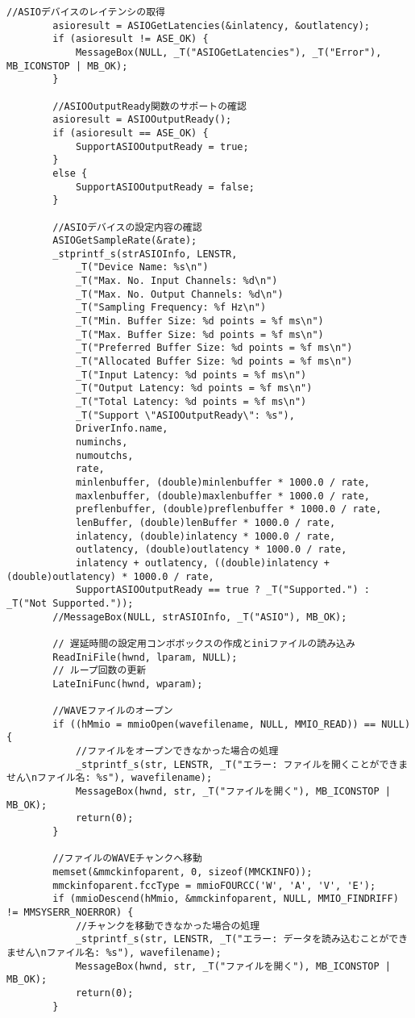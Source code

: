 \begin{lstlisting}[caption=main.cpp]
		//ASIOデバイスのレイテンシの取得
		asioresult = ASIOGetLatencies(&inlatency, &outlatency);
		if (asioresult != ASE_OK) {
			MessageBox(NULL, _T("ASIOGetLatencies"), _T("Error"), MB_ICONSTOP | MB_OK);
		}

		//ASIOOutputReady関数のサポートの確認
		asioresult = ASIOOutputReady();
		if (asioresult == ASE_OK) {
			SupportASIOOutputReady = true;
		}
		else {
			SupportASIOOutputReady = false;
		}

		//ASIOデバイスの設定内容の確認
		ASIOGetSampleRate(&rate);
		_stprintf_s(strASIOInfo, LENSTR,
			_T("Device Name: %s\n")
			_T("Max. No. Input Channels: %d\n")
			_T("Max. No. Output Channels: %d\n")
			_T("Sampling Frequency: %f Hz\n")
			_T("Min. Buffer Size: %d points = %f ms\n")
			_T("Max. Buffer Size: %d points = %f ms\n")
			_T("Preferred Buffer Size: %d points = %f ms\n")
			_T("Allocated Buffer Size: %d points = %f ms\n")
			_T("Input Latency: %d points = %f ms\n")
			_T("Output Latency: %d points = %f ms\n")
			_T("Total Latency: %d points = %f ms\n")
			_T("Support \"ASIOOutputReady\": %s"),
			DriverInfo.name,
			numinchs,
			numoutchs,
			rate,
			minlenbuffer, (double)minlenbuffer * 1000.0 / rate,
			maxlenbuffer, (double)maxlenbuffer * 1000.0 / rate,
			preflenbuffer, (double)preflenbuffer * 1000.0 / rate,
			lenBuffer, (double)lenBuffer * 1000.0 / rate,
			inlatency, (double)inlatency * 1000.0 / rate,
			outlatency, (double)outlatency * 1000.0 / rate,
			inlatency + outlatency, ((double)inlatency + (double)outlatency) * 1000.0 / rate,
			SupportASIOOutputReady == true ? _T("Supported.") : _T("Not Supported."));
		//MessageBox(NULL, strASIOInfo, _T("ASIO"), MB_OK);

		// 遅延時間の設定用コンボボックスの作成とiniファイルの読み込み
		ReadIniFile(hwnd, lparam, NULL);
		// ループ回数の更新
		LateIniFunc(hwnd, wparam);

		//WAVEファイルのオープン
		if ((hMmio = mmioOpen(wavefilename, NULL, MMIO_READ)) == NULL) {
			//ファイルをオープンできなかった場合の処理
			_stprintf_s(str, LENSTR, _T("エラー: ファイルを開くことができません\nファイル名: %s"), wavefilename);
			MessageBox(hwnd, str, _T("ファイルを開く"), MB_ICONSTOP | MB_OK);
			return(0);
		}

		//ファイルのWAVEチャンクへ移動
		memset(&mmckinfoparent, 0, sizeof(MMCKINFO));
		mmckinfoparent.fccType = mmioFOURCC('W', 'A', 'V', 'E');
		if (mmioDescend(hMmio, &mmckinfoparent, NULL, MMIO_FINDRIFF) != MMSYSERR_NOERROR) {
			//チャンクを移動できなかった場合の処理
			_stprintf_s(str, LENSTR, _T("エラー: データを読み込むことができません\nファイル名: %s"), wavefilename);
			MessageBox(hwnd, str, _T("ファイルを開く"), MB_ICONSTOP | MB_OK);
			return(0);
		}


\end{lstlisting}
